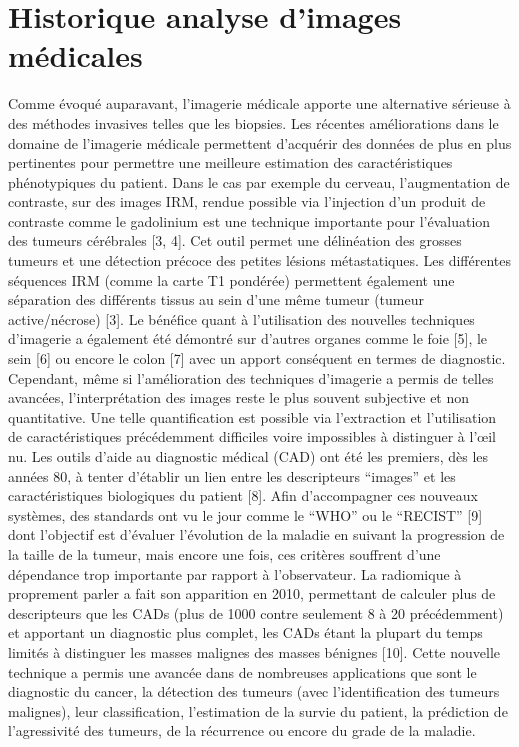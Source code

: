 \documentclass[]{memoir}
\begin{document}
\section{Historique analyse d’images médicales}
Comme évoqué auparavant, l’imagerie médicale apporte une alternative sérieuse à des méthodes invasives telles que les biopsies.
Les récentes améliorations dans le domaine de l’imagerie médicale permettent d’acquérir des données de plus en plus pertinentes pour permettre une meilleure estimation des caractéristiques phénotypiques du patient.
Dans le cas par exemple du cerveau, l’augmentation de contraste, sur des images IRM, rendue possible via l’injection d’un produit de contraste comme le gadolinium est une technique importante pour l’évaluation des tumeurs cérébrales [3, 4]. Cet outil permet une délinéation des grosses tumeurs et une détection précoce des petites lésions métastatiques. Les différentes séquences IRM (comme la carte T1 pondérée) permettent également une séparation des différents tissus au sein d’une même tumeur (tumeur active/nécrose) [3].
Le bénéfice quant à l’utilisation des nouvelles techniques d’imagerie a également été démontré sur d’autres organes comme le foie [5], le sein [6] ou encore le colon [7] avec un apport conséquent en termes de diagnostic.
Cependant, même si l’amélioration des techniques d’imagerie a permis de telles avancées, l’interprétation des images reste le plus souvent subjective et non quantitative. Une telle quantification est possible via l’extraction et l’utilisation de caractéristiques précédemment difficiles voire impossibles à distinguer à l'œil nu.
Les outils d’aide au diagnostic médical (CAD) ont été les premiers, dès les années 80, à tenter d’établir un lien entre les descripteurs “images” et les caractéristiques biologiques du patient [8].
Afin d’accompagner ces nouveaux systèmes, des standards ont vu le jour comme le “WHO” ou le “RECIST” [9] dont l’objectif est d’évaluer l’évolution de la maladie en suivant la progression de la taille de la tumeur, mais encore une fois, ces critères souffrent d’une dépendance trop importante par rapport à l’observateur.
La radiomique à proprement parler a fait son apparition en 2010, permettant de calculer plus de descripteurs que les CADs (plus de 1000 contre seulement 8 à 20 précédemment) et apportant un diagnostic plus complet, les CADs étant la plupart du temps limités à distinguer les masses malignes des masses bénignes [10]. 
Cette nouvelle technique a permis une avancée dans de nombreuses applications que sont le diagnostic du cancer, la détection des tumeurs (avec l’identification des tumeurs malignes), leur classification, l’estimation de la survie du patient, la prédiction de l’agressivité des tumeurs, de la récurrence ou encore du grade de la maladie.
\end{document}
